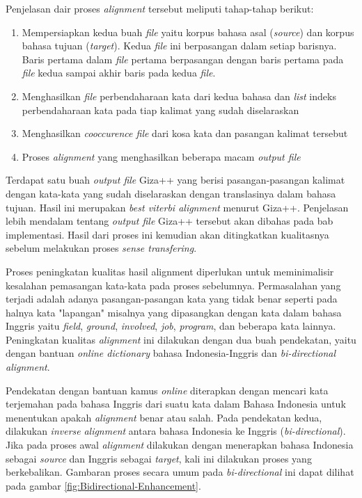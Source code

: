 Penjelasan dair proses \textit{alignment} tersebut meliputi tahap-tahap berikut:
\begin{enumerate}
	\item Mempersiapkan kedua buah \textit{file} yaitu korpus bahasa asal (\textit{source}) dan korpus bahasa tujuan (\textit{target}). Kedua \textit{file} ini berpasangan dalam setiap barisnya. Baris pertama dalam \textit{file} pertama berpasangan dengan baris pertama pada \textit{file} kedua sampai akhir baris pada kedua \textit{file}.
	\item Menghasilkan \textit{file} perbendaharaan kata dari kedua bahasa dan \textit{list} indeks perbendaharaan kata pada tiap kalimat yang sudah diselaraskan
	\item Menghasilkan \textit{cooccurence file} dari kosa kata dan pasangan kalimat tersebut
	\item Proses \textit{alignment} yang menghasilkan beberapa macam \textit{output file} 
\end{enumerate}

Terdapat satu buah \textit{output file} Giza++ yang berisi pasangan-pasangan kalimat dengan kata-kata yang sudah diselaraskan dengan translasinya dalam bahasa tujuan. Hasil ini merupakan \textit{best viterbi alignment} menurut Giza++. Penjelasan lebih mendalam tentang \textit{output file} Giza++ tersebut akan dibahas pada bab implementasi. Hasil dari proses ini kemudian akan ditingkatkan kualitasnya sebelum melakukan proses \textit{sense transfering}.

Proses peningkatan kualitas hasil alignment diperlukan untuk meminimalisir kesalahan pemasangan kata-kata pada proses sebelumnya. Permasalahan  yang terjadi adalah adanya pasangan-pasangan kata yang tidak benar seperti pada halnya kata "lapangan" misalnya yang  dipasangkan dengan kata dalam bahasa Inggris yaitu \textit{field}, \textit{ground}, \textit{involved}, \textit{job}, \textit{program}, dan beberapa kata lainnya. Peningkatan kualitas \textit{alignment} ini dilakukan dengan dua buah pendekatan, yaitu dengan bantuan \textit{online dictionary} bahasa Indonesia-Inggris dan \textit{bi-directional alignment}. 

Pendekatan dengan bantuan kamus \textit{online} diterapkan dengan mencari kata terjemahan pada bahasa Inggris dari suatu kata dalam Bahasa Indonesia untuk menentukan apakah \textit{alignment} benar atau salah. Pada pendekatan kedua, dilakukan \textit{inverse} \textit{alignment} antara bahasa Indonesia ke Inggris (\textit{bi-directional}). Jika pada proses awal \textit{alignment} dilakukan dengan menerapkan bahasa Indonesia sebagai \textit{source} dan Inggris sebagai \textit{target}, kali ini dilakukan proses yang berkebalikan. Gambaran proses secara umum pada \textit{bi-directional} ini dapat dilihat pada gambar \ref{fig:Bidirectional-Enhancement}.

